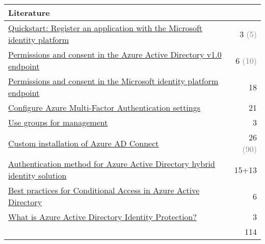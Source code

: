 \begin{tabular}{p{14cm} | r}
\textbf{Literature} & \\
\hline
\href{https://docs.microsoft.com/en-us/azure/active-directory/develop/quickstart-register-app}{Quickstart: Register an application with the Microsoft identity platform} & 3 \textcolor{gray}{(5)} \\
\href{https://docs.microsoft.com/en-us/azure/active-directory/develop/v1-permissions-and-consent}{Permissions and consent in the Azure Active Directory v1.0 endpoint} & 6 \textcolor{gray}{(10)} \\
\href{https://docs.microsoft.com/en-us/azure/active-directory/develop/v2-permissions-and-consent}{Permissions and consent in the Microsoft identity platform endpoint} & 18 \\
\href{https://docs.microsoft.com/en-us/azure/active-directory/authentication/howto-mfa-mfasettings}{Configure Azure Multi-Factor Authentication settings} & 21 \\
\href{https://docs.microsoft.com/en-us/microsoft-365/enterprise/identity-use-group-management}{Use groups for management} & 3 \\
\href{https://docs.microsoft.com/en-us/azure/active-directory/hybrid/how-to-connect-install-custom}{Custom installation of Azure AD Connect} & 26 \textcolor{gray}{(90)} \\
\href{https://docs.microsoft.com/en-us/azure/security/fundamentals/choose-ad-authn}{Authentication method for Azure Active Directory hybrid identity solution} & 15+13 \\
\href{https://docs.microsoft.com/en-us/azure/active-directory/conditional-access/best-practices}{Best practices for Conditional Access in Azure Active Directory} & 6 \\
\href{https://docs.microsoft.com/en-us/azure/active-directory/identity-protection/overview-identity-protection}{What is Azure Active Directory Identity Protection?} & 3 \\
\cline{2-2} 
 & 114
\end{tabular}


